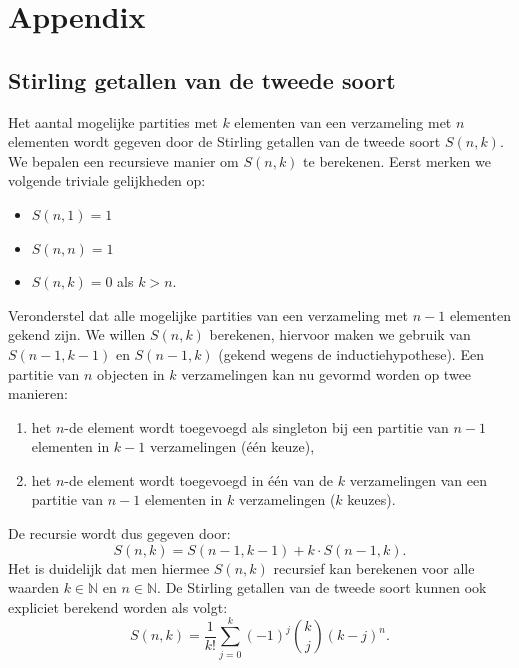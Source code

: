 \documentclass[a4paper,12pt]{article}
\theoremstyle{definition}
\begin{document}
\newpage
\setcounter{section}{0}
\renewcommand{\thesection}{\Alph{section}}
\section{Appendix}
\subsection{Stirling getallen van de tweede soort}
\label{stirling}
Het aantal mogelijke partities met $k$ elementen van een verzameling met $n$ elementen wordt gegeven door
de Stirling getallen van de tweede soort $S(n,k)$.
We bepalen een recursieve manier om $S(n,k)$ te berekenen.
Eerst merken we volgende triviale gelijkheden op:
\begin{itemize}
	\item $S(n,1) = 1$
	\item $S(n,n) = 1$
	\item $S(n,k) = 0$ \quad als $k>n$.
\end{itemize}
Veronderstel dat alle mogelijke partities van een verzameling met $n-1$ elementen gekend zijn.
We willen $S(n,k)$ berekenen, hiervoor maken we gebruik van $S(n-1,k-1)$ en $S(n-1,k)$ (gekend wegens de inductiehypothese).
Een partitie van $n$ objecten in $k$ verzamelingen kan nu gevormd worden op twee manieren:
\begin{enumerate}
	\item het $n$-de element wordt toegevoegd als singleton bij een partitie van $n-1$ elementen in $k-1$ verzamelingen (één keuze),
	\item het $n$-de element wordt toegevoegd in één van de $k$ verzamelingen van een partitie van  $n-1$ elementen in $k$ verzamelingen ($k$ keuzes).
\end{enumerate} 
De recursie wordt dus gegeven door:
$$S(n,k) = S(n-1,k-1) + k\cdot S(n-1,k).$$
Het is duidelijk dat men hiermee $S(n,k)$ recursief kan berekenen voor alle waarden $k\in \mathbb{N}$ en $n\in \mathbb{N}$.
De Stirling getallen van de tweede soort kunnen ook expliciet berekend worden als volgt:
$$S(n,k) = \dfrac{1}{k!}\sum\limits_{j=0}^k(-1)^j\binom{k}{j}(k-j)^n.$$


\newpage
{}
\nocite{jain1988algorithms}
\nocite{wiki}

\end{document}
